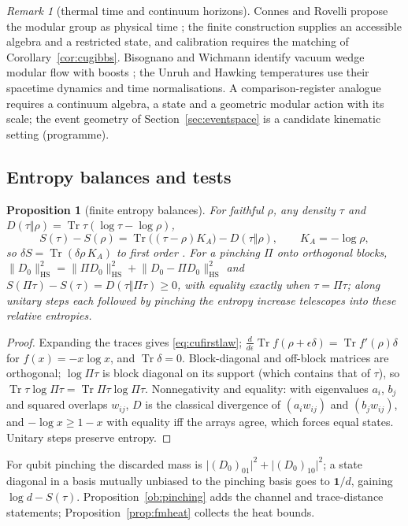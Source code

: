 \documentclass[aps,pra,onecolumn,superscriptaddress,nofootinbib,10pt]{revtex4-2}
\newtheorem{proposition}[theorem]{Proposition}
\theoremstyle{definition}
\theoremstyle{remark}
\newtheorem{remark}[theorem]{Remark}
\newcommand{\tr}{\operatorname{Tr}}
\begin{document}
\begin{remark}[thermal time and continuum horizons]\label{rem:cuthermal}
Connes and Rovelli propose the modular group as physical time \cite{n1-connes}; the finite construction
supplies an accessible algebra and a restricted state, and calibration requires the matching of
Corollary~\ref{cor:cugibbs}.  Bisognano and Wichmann identify vacuum wedge modular flow with boosts \cite{n1-bw};
the Unruh and Hawking temperatures \cite{n1-unruh,n1-hawking} use their spacetime dynamics and time
normalisations.  A comparison-register analogue requires a continuum algebra, a state and a geometric
modular action with its scale; the event geometry of Section~\ref{sec:eventspace} is a candidate kinematic setting
(programme).
\end{remark}

\subsection{Entropy balances and tests}\label{sec:cuentropy}

\begin{proposition}[finite entropy balances]\label{prop:cubalances}
For faithful $\rho$, any density $\tau$ and $D(\tau\Vert\rho)=\tr\tau(\log\tau-\log\rho)$,
\begin{equation}\label{eq:cufirstlaw}
S(\tau)-S(\rho)=\tr\bigl((\tau-\rho)K_A\bigr)-D(\tau\Vert\rho),\qquad K_A=-\log\rho,
\end{equation}
so $\delta S=\tr(\delta\rho\,K_A)$ to first order \cite{n1-blanco}.  For a pinching $\Pi$ onto orthogonal blocks,
$\lVert D_0\rVert_{\mathrm{HS}}^2=\lVert\Pi D_0\rVert_{\mathrm{HS}}^2+\lVert D_0-\Pi D_0\rVert_{\mathrm{HS}}^2$ and $S(\Pi\tau)-S(\tau)=D(\tau\Vert\Pi\tau)\ge0$, with equality exactly when $\tau=\Pi\tau$; along
unitary steps each followed by pinching the entropy increase telescopes into these relative entropies.
\end{proposition}
\begin{proof}
Expanding the traces gives \eqref{eq:cufirstlaw}; $\frac{d}{d\epsilon}\tr f(\rho+\epsilon\delta)=\tr f'(\rho)\delta$ for $f(x)=-x\log x$, and $\tr\delta=0$.  Block-diagonal and
off-block matrices are orthogonal; $\log\Pi\tau$ is block diagonal on its support (which contains that of $\tau$), so
$\tr\tau\log\Pi\tau=\tr\Pi\tau\log\Pi\tau$.  Nonnegativity and equality: with eigenvalues $a_i$, $b_j$ and squared overlaps $w_{ij}$,
$D$ is the classical divergence of $(a_iw_{ij})$ and $(b_jw_{ij})$, and $-\log x\ge1-x$ with equality iff the arrays agree,
which forces equal states.  Unitary steps preserve entropy.
\end{proof}
\noindent For qubit pinching the discarded mass is $\lvert(D_0)_{01}\rvert^2+\lvert(D_0)_{10}\rvert^2$; a state diagonal in a basis mutually unbiased
to the pinching basis goes to $\mathbf1/d$, gaining $\log d-S(\tau)$.  Proposition~\ref{ob:pinching} adds the channel and
trace-distance statements; Proposition~\ref{prop:fmheat} collects the heat bounds.
\end{document}
